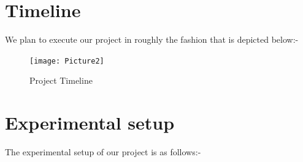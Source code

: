 \documentclass[a4paper,12pt]{article}
\begin{document}
\section{Timeline}
We plan to execute our project in roughly the fashion that is depicted below:-
\begin{figure}[h]
\centering
\texttt{[image: Picture2]}
\caption{Project Timeline}
\end{figure}

\vspace{4cm}

\section{Experimental setup}
The experimental setup of our project is as follows:-
\end{document}
